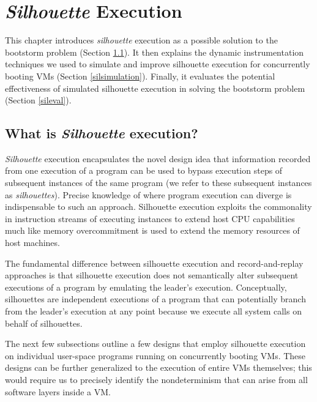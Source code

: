 \chapter{{\em Silhouette} Execution}
This chapter introduces {\em silhouette} 
execution as a possible solution to the bootstorm
problem (Section \ref{def:sil}).
It then explains the dynamic instrumentation 
techniques we used to simulate and improve silhouette execution
for concurrently booting VMs (Section \ref{silsimulation}). Finally,
it evaluates the potential effectiveness
of simulated silhouette execution in solving the 
bootstorm problem (Section \ref{sileval}). 

\section{What is {\em Silhouette} execution?} \label{def:sil}
{\em Silhouette} execution encapsulates the 
novel design idea that information recorded from one
execution of a program can be used to 
bypass execution steps of subsequent instances
of the same program (we refer to these
subsequent instances as {\em silhouettes}). 
Precise knowledge
of where program execution can diverge 
is indispensable to such an approach.
Silhouette execution exploits
the commonality in instruction
streams of executing instances
to extend host CPU capabilities much like
memory overcommitment is used to extend
the memory resources of host machines.

The fundamental difference
between silhouette execution and record-and-replay
approaches is that silhouette execution
does not semantically alter subsequent executions
of a program by emulating the leader's execution. 
Conceptually, silhouettes are independent executions of a program
that can potentially branch from the leader's execution at any point
because we execute all system calls on behalf of silhouettes.

The next few subsections outline a few
designs that employ silhouette execution
on individual user-space programs
running on concurrently booting VMs.
These designs can be further generalized to the execution of entire
VMs themselves; this would require us to precisely
identify the nondeterminism that can
arise from all software layers inside a VM.

